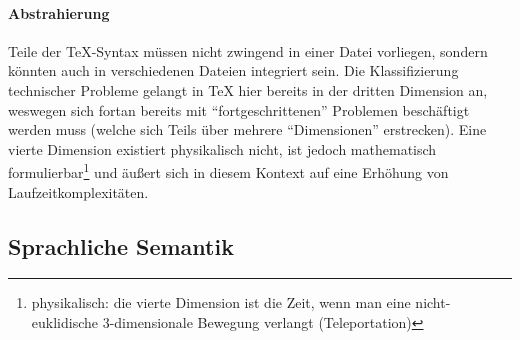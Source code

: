 \paragraph*{Abstrahierung}%
Teile der \TeX-Syntax müssen nicht zwingend in einer Datei vorliegen, sondern könnten auch in verschiedenen Dateien integriert sein. Die Klassifizierung technischer Probleme gelangt in \TeX{} hier bereits in der dritten Dimension an, weswegen sich fortan bereits mit \enquote{fortgeschrittenen} Problemen beschäftigt werden muss (welche sich Teils über mehrere \enquote{Dimensionen} erstrecken). Eine vierte Dimension existiert physikalisch nicht, ist jedoch mathematisch formulierbar\footnote{physikalisch: die vierte Dimension ist die Zeit, wenn man eine nicht-euklidische 3-dimensionale Bewegung verlangt (Teleportation)} und äußert sich in diesem Kontext auf eine Erhöhung von Laufzeitkomplexitäten.

















\subsection{Sprachliche Semantik}\label{problems:linguistical}
